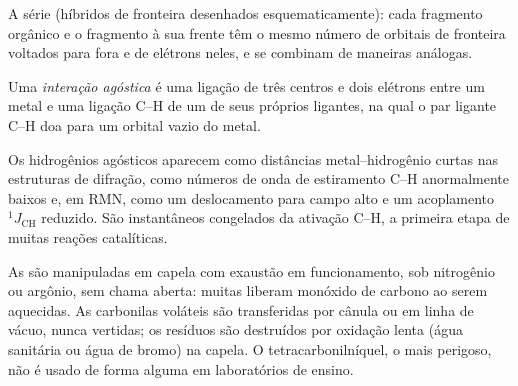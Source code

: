 \begin{omfigure}

{\small A série  (híbridos de fronteira desenhados esquematicamente): cada fragmento
orgânico e o fragmento  à sua frente têm o mesmo número de
orbitais de fronteira voltados para fora e de elétrons neles, e se combinam de
maneiras análogas.}
\end{omfigure}

\begin{definition}\label{def:b3:organometallic-bonding:agostic}
Uma \emph{interação agóstica} é uma ligação de três centros
e dois elétrons entre um metal e uma ligação C--H de um de seus próprios ligantes, na
qual o par ligante C--H doa para um orbital vazio do metal.
\end{definition}

Os hidrogênios agósticos aparecem como distâncias metal--hidrogênio curtas nas estruturas
de difração, como números de onda de estiramento C--H anormalmente baixos e, em RMN, como um
deslocamento para campo alto e um acoplamento $^1J_{\mathrm{CH}}$ reduzido. São instantâneos congelados da
ativação C--H, a primeira etapa de muitas reações catalíticas.

\begin{inthelab}
As  são manipuladas em capela com exaustão em funcionamento, sob
nitrogênio ou argônio, sem chama aberta: muitas liberam monóxido de carbono ao serem
aquecidas. As carbonilas voláteis são transferidas por cânula ou em linha de vácuo, nunca
vertidas; os resíduos são destruídos por oxidação lenta (água sanitária ou água de bromo) na
capela. O tetracarbonilníquel, o mais perigoso, não é usado de forma alguma em laboratórios
de ensino.
\end{inthelab}

